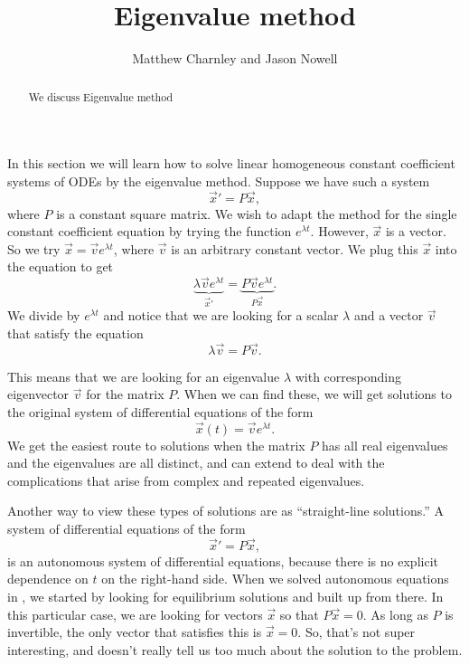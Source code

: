 \documentclass{ximera}
\title{Eigenvalue method}
\author{Matthew Charnley and Jason Nowell}
\begin{document}
\begin{abstract}
    We discuss Eigenvalue method
\end{abstract}
\maketitle

\label{eigenmethod:section}


In this section we will learn how to solve linear homogeneous constant coefficient systems of ODEs by the eigenvalue method. Suppose we have such a system
\begin{equation*}
    {\vec{x}}' = P\vec{x} ,
\end{equation*}
where $P$ is a constant square matrix. We wish to adapt the method for the single constant coefficient equation by trying the function $e^{\lambda t}$. However, $\vec{x}$ is a vector.  So we try $\vec{x} = \vec{v} e^{\lambda t}$, where $\vec{v}$ is an arbitrary constant vector.  We plug this $\vec{x}$ into the equation to get
\begin{equation*}
    \underbrace{\lambda \vec{v} e^{\lambda t}}_{{\vec{x}}'} = \underbrace{P\vec{v} e^{\lambda t}}_{P\vec{x}} .
\end{equation*}
We divide by $e^{\lambda t}$ and notice that we are looking for a scalar $\lambda$ and a vector $\vec{v}$ that satisfy the equation
\begin{equation*}
    \lambda \vec{v} = P\vec{v} .
\end{equation*}

This means that we are looking for an eigenvalue $\lambda$ with corresponding eigenvector $\vec{v}$ for the matrix $P$. When we can find these, we will get solutions to the original system of differential equations of the form 
\[ 
    \vec{x}(t) = \vec{v}e^{\lambda t}. 
\] 
We get the easiest route to solutions when the matrix $P$ has all real eigenvalues and the eigenvalues are all distinct, and can extend to deal with the complications that arise from complex and repeated eigenvalues.  

Another way to view these types of solutions are as ``straight-line solutions.'' A system of differential equations of the form 
\begin{equation*}
    {\vec{x}}' = P\vec{x} ,
\end{equation*}
is an autonomous system of differential equations, because there is no explicit dependence on $t$ on the right-hand side. When we solved autonomous equations in , we started by looking for equilibrium solutions and built up from there. In this particular case, we are looking for vectors $\vec{x}$ so that $P\vec{x} = 0$. As long as $P$ is invertible, the only vector that satisfies this is $\vec{x} = 0$. So, that's not super interesting, and doesn't really tell us too much about the solution to the problem.
\end{document}
